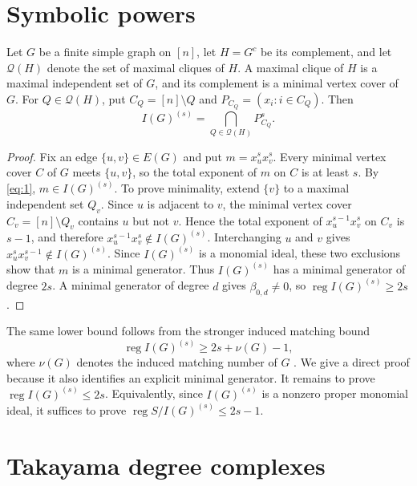 \documentclass[11pt]{amsart}
\newtheorem{lemma}[theorem]{Lemma}
\theoremstyle{definition}
\newcommand{\reg}{\operatorname{reg}}
\newcommand{\cQ}{\mathcal Q}
\begin{document}
\section{Symbolic powers}\label{sec:1}

Let $G$ be a finite simple graph on $[n]$, let $H=G^c$ be its complement, and let $\cQ(H)$ denote the set of maximal cliques of $H$. A maximal clique of $H$ is a maximal independent set of $G$, and its complement is a minimal vertex cover of $G$. For $Q\in\cQ(H)$, put $C_Q=[n]\setminus Q$ and $P_{C_Q}=(x_i:i\in C_Q)$. Then
\begin{equation}\label{eq:1}
I(G)^{(s)}=\bigcap_{Q\in\cQ(H)}P_{C_Q}^s.
\end{equation}

\begin{proof}
Fix an edge $\{u,v\}\in E(G)$ and put $m=x_u^s x_v^s$. Every minimal vertex cover $C$ of $G$ meets $\{u,v\}$, so the total exponent of $m$ on $C$ is at least $s$. By \cref{eq:1}, $m\in I(G)^{(s)}$. To prove minimality, extend $\{v\}$ to a maximal independent set $Q_v$. Since $u$ is adjacent to $v$, the minimal vertex cover $C_v=[n]\setminus Q_v$ contains $u$ but not $v$. Hence the total exponent of $x_u^{s-1}x_v^s$ on $C_v$ is $s-1$, and therefore $x_u^{s-1}x_v^s\notin I(G)^{(s)}$. Interchanging $u$ and $v$ gives $x_u^s x_v^{s-1}\notin I(G)^{(s)}$. Since $I(G)^{(s)}$ is a monomial ideal, these two exclusions show that $m$ is a minimal generator. Thus $I(G)^{(s)}$ has a minimal generator of degree $2s$. A minimal generator of degree $d$ gives $\beta_{0,d}\ne0$, so $\reg I(G)^{(s)}\ge2s$.
\end{proof}

The same lower bound follows from the stronger induced matching bound
\[
\reg I(G)^{(s)}\ge 2s+\nu(G)-1,
\]
where $\nu(G)$ denotes the induced matching number of $G$ \cite[Theorem~4.6]{GuHaORourkeSkelton}. We give a direct proof because it also identifies an explicit minimal generator. It remains to prove $\reg I(G)^{(s)}\le2s$. Equivalently, since $I(G)^{(s)}$ is a nonzero proper monomial ideal, it suffices to prove $\reg S/I(G)^{(s)}\le2s-1$.

\section{Takayama degree complexes}\label{sec:2}
\end{document}
